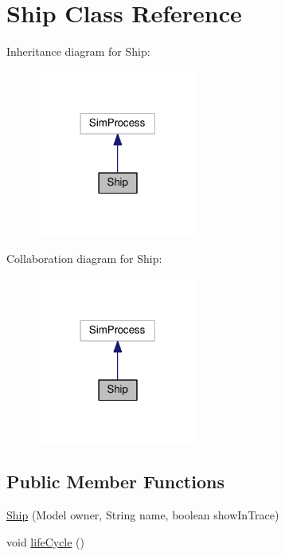 \hypertarget{class_ship}{\section{Ship Class Reference}
\label{class_ship}
}


Inheritance diagram for Ship\-:
\nopagebreak
\begin{figure}[H]
\begin{center}
\leavevmode
\includegraphics[width=150pt]{class_ship__inherit__graph}
\end{center}
\end{figure}


Collaboration diagram for Ship\-:
\nopagebreak
\begin{figure}[H]
\begin{center}
\leavevmode
\includegraphics[width=150pt]{class_ship__coll__graph}
\end{center}
\end{figure}
\subsection*{Public Member Functions}
\begin{DoxyCompactItemize}
\item 
\hyperlink{class_ship_a8f3b6e601c7487a18699452dbdcf163c}{Ship} (Model owner, String name, boolean show\-In\-Trace)
\item 
void \hyperlink{class_ship_a553ad1866574241a0d48d80cbdb7cf21}{life\-Cycle} ()
\end{DoxyCompactItemize}
